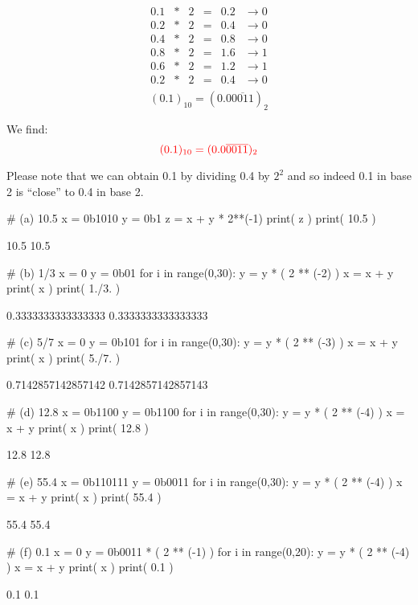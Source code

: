 \documentclass[pdftex,11pt]{article}
\begin{document}
\begin{enumerate}
$$
\begin{array}{rcrccc}
0.1& *& 2   & = & 0.2 &    \rightarrow     0  \\
0.2& *& 2   & = & 0.4 &    \rightarrow     0  \\
0.4& *& 2   & = & 0.8 &    \rightarrow     0  \\
0.8& *& 2   & = & 1.6 &    \rightarrow     1  \\
0.6& *& 2   & = & 1.2 &    \rightarrow     1  \\
\hline
0.2& *& 2   & = & 0.4 &    \rightarrow     0  \\
\end{array}
$$
$$ (0.1)_{10} = (0.0\overline{0011})_2$$

We find:
$$\color{red} (0.1)_{10} = (0.0\overline{0011})_2 $$

\color{blue}
Please note that we can obtain 0.1 by dividing 0.4 by $2^2$ and so indeed 0.1 in base 2 is ``close'' to 0.4 in base 2. 
\color{black}




\end{enumerate}

\begin{python}
# (a) 10.5
x = 0b1010
y = 0b1
z = x + y * 2**(-1)
print( z )
print( 10.5 )
\end{python}
\begin{pythonoutput}
10.5
10.5
\end{pythonoutput}
\begin{python}
# (b) 1/3
x = 0
y = 0b01
for i in range(0,30):
  y = y * ( 2 ** (-2) )
  x = x + y
print( x )
print( 1./3. )
\end{python}
\begin{pythonoutput}
0.3333333333333333
0.3333333333333333
\end{pythonoutput}
\begin{python}
# (c) 5/7
x = 0
y = 0b101
for i in range(0,30):
  y = y * ( 2 ** (-3) )
  x = x + y
print( x )
print( 5./7. )
\end{python}
\begin{pythonoutput}
0.7142857142857142
0.7142857142857143
\end{pythonoutput}
\begin{python}
# (d) 12.8
x = 0b1100
y = 0b1100
for i in range(0,30):
  y = y * ( 2 ** (-4) )
  x = x + y
print( x )
print( 12.8 )
\end{python}
\begin{pythonoutput}
12.8
12.8
\end{pythonoutput}
\begin{python}
# (e) 55.4
x = 0b110111
y = 0b0011
for i in range(0,30):
  y = y * ( 2 ** (-4) )
  x = x + y
print( x )
print( 55.4 )
\end{python}
\begin{pythonoutput}
55.4
55.4
\end{pythonoutput}
\begin{python}
# (f) 0.1
x = 0
y = 0b0011 * ( 2 ** (-1) )
for i in range(0,20):
  y = y * ( 2 ** (-4) )
  x = x + y
print( x )
print( 0.1 )
\end{python}
\begin{pythonoutput}
0.1
0.1
\end{pythonoutput}
\end{document}
